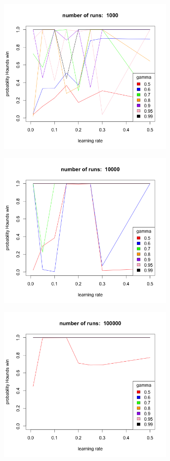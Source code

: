 \documentclass{beamer}
\begin{document}
\begin{frame}
    \centering
    \includegraphics[width=0.65\textwidth]{r1000.png}
\end{frame}

\begin{frame}
    \centering
    \includegraphics[width=0.65\textwidth]{r10000.png}
\end{frame}

\begin{frame}
    \centering
    \includegraphics[width=0.65\textwidth]{r100000.png}
\end{frame}
\end{document}
